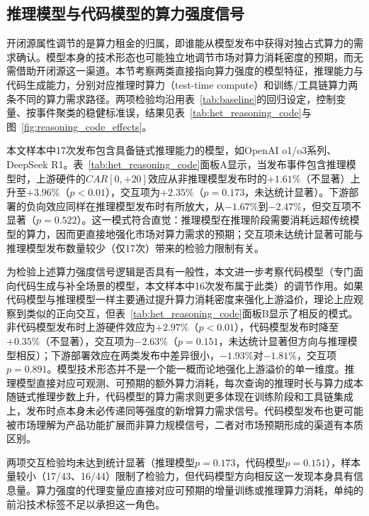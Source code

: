 \documentclass[11pt,fontset=fandol,a4paper]{ctexart}
\newcommand{\changed}[1]{{\color{orange!85!black}#1}}
\begin{document}
\subsection{推理模型与代码模型的算力强度信号}\label{sec:reasoning_code_het}

开闭源属性调节的是算力租金的归属，即谁能从模型发布中获得对独占式算力的需求确认。模型本身的技术形态也可能独立地调节市场对算力消耗密度的预期，而无需借助开闭源这一渠道。本节考察两类直接指向算力强度的模型特征，推理能力与代码生成能力，分别对应推理时算力（test-time compute）和训练/工具链算力两条不同的算力需求路径。两项检验均沿用表~\ref{tab:baseline}的回归设定，控制变量、按事件聚类的稳健标准误，结果见表~\ref{tab:het_reasoning_code}与图~\ref{fig:reasoning_code_effects}。

本文样本中17次发布包含具备链式推理能力的模型，如OpenAI o1/o3系列、DeepSeek R1。表~\ref{tab:het_reasoning_code}面板A显示，当发布事件包含推理模型时，上游硬件的$CAR[0,+20]$效应从非推理模型发布时的$+1.61\%$（不显著）上升至$+3.96\%$（$p<0.01$），交互项为$+2.35\%$（$p=0.173$，未达统计显著）。下游部署的负向效应同样在推理模型发布时有所放大，从$-1.67\%$到$-2.47\%$，但交互项不显著（$p=0.522$）。这一模式符合直觉：推理模型在推理阶段需要消耗远超传统模型的算力，因而更直接地强化市场对算力需求的预期；交互项未达统计显著可能与推理模型发布数量较少（仅17次）带来的检验力限制有关。

为检验上述算力强度信号逻辑是否具有一般性，本文进一步考察代码模型（专门面向代码生成与补全场景的模型，本文样本中16次发布属于此类）的调节作用。如果代码模型与推理模型一样主要通过提升算力消耗密度来强化上游溢价，理论上应观察到类似的正向交互，但表~\ref{tab:het_reasoning_code}面板B显示了相反的模式。非代码模型发布时上游硬件效应为$+2.97\%$（$p<0.01$），代码模型发布时降至$+0.35\%$（不显著），交互项为$-2.63\%$（$p=0.151$，未达统计显著但方向与推理模型相反）；下游部署效应在两类发布中差异很小，$-1.93\%$对$-1.81\%$，交互项$p=0.891$。模型技术形态并不是一个能一概而论地强化上游溢价的单一维度。推理模型直接对应可观测、可预期的额外算力消耗，每次查询的推理时长与算力成本随链式推理步数上升，代码模型的算力需求则更多体现在训练阶段和工具链集成上，发布时点本身未必传递同等强度的新增算力需求信号。代码模型发布也更可能被市场理解为产品功能扩展而非算力规模信号，二者对市场预期形成的渠道有本质区别。

\changed{两项交互检验均未达到统计显著（推理模型$p=0.173$，代码模型$p=0.151$），样本量较小（17/43、16/44）限制了检验力，但代码模型方向相反这一发现本身具有信息量。算力强度的代理变量应直接对应可预期的增量训练或推理算力消耗，单纯的前沿技术标签不足以承担这一角色。}
\end{document}
